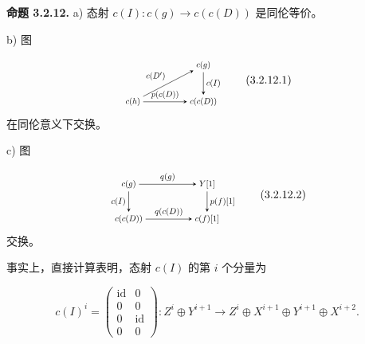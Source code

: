 \clearpage
{}%
\begingroup
\setlength{\abovedisplayskip}{4pt plus 2pt minus 2pt}%
\setlength{\belowdisplayskip}{4pt plus 2pt minus 2pt}%
\noindent\textbf{命题 3.2.12.}\quad
{}
a) 态射 $c(I)\colon c(g)\longrightarrow c(c(D))$ 是同伦等价。

b) 图

\begin{equation}
  \begin{tikzpicture}[>=stealth,baseline=(current bounding box.center),scale=0.74,
    every node/.style={transform shape}]
    \node (Ch) at (0,0) {$c(h)$};
    \node (Cg) at (3.0,1.55) {$c(g)$};
    \node (CcD) at (3.0,0) {$c(c(D))$};
    \draw[->] (Ch) -- node[above left] {$c(D')$} (Cg);
    \draw[->] (Cg) -- node[right] {$c(I)$} (CcD);
    \draw[->] (Ch) -- node[above] {$p(c(D))$} (CcD);
  \end{tikzpicture}
  \tag{3.2.12.1}
\end{equation}
在同伦意义下交换。

c) 图

\begin{equation}
  \begin{tikzpicture}[>=stealth,baseline=(current bounding box.center),scale=0.76,
    every node/.style={transform shape}]
    \node (Cg) at (0,1.45) {$c(g)$};
    \node (Y) at (3.25,1.45) {$Y[1]$};
    \node (CcD) at (0,0) {$c(c(D))$};
    \node (Cf) at (3.25,0) {$c(f)[1]$};
    \draw[->] (Cg) -- node[above] {$q(g)$} (Y);
    \draw[->] (Cg) -- node[left] {$c(I)$} (CcD);
    \draw[->] (Y) -- node[right] {$p(f)[1]$} (Cf);
    \draw[->] (CcD) -- node[above] {$q(c(D))$} (Cf);
  \end{tikzpicture}
  \tag{3.2.12.2}
\end{equation}
交换。

事实上，直接计算表明，态射 $c(I)$ 的第 $i$ 个分量为

\begin{equation}
  c(I)^i=
  \begin{pmatrix}
    \operatorname{id}&0\\
    0&0\\
    0&\operatorname{id}\\
    0&0
  \end{pmatrix}
  \colon Z^i\oplus Y^{i+1}\longrightarrow
  Z^i\oplus X^{i+1}\oplus Y^{i+1}\oplus X^{i+2}.
  \tag{3.2.12.3}
\end{equation}

